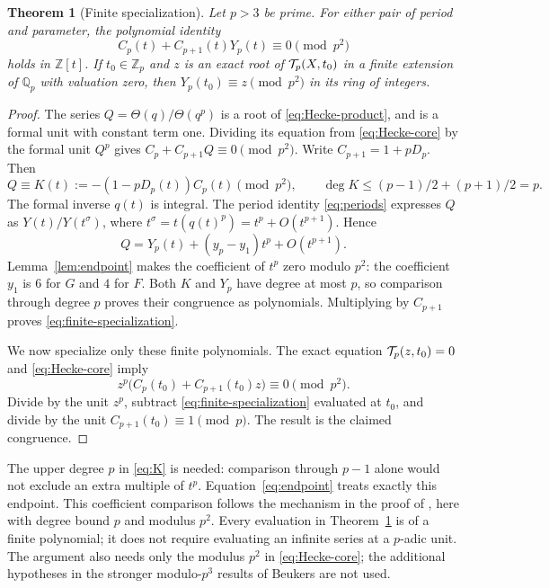 \documentclass[11pt,a4paper]{article}
\newtheorem{theorem}{Theorem}[section]
\theoremstyle{remark}\newtheorem{remark}[theorem]{Remark}
\newcommand{\Z}{\mathbb Z}\newcommand{\Q}{\mathbb Q}
\begin{document}
\begin{theorem}[Finite specialization]\label{thm:specialization}
Let $p>3$ be prime. For either pair of period and parameter, the polynomial identity
\begin{equation}\label{eq:finite-specialization}
 C_p(t)+C_{p+1}(t)Y_p(t)\equiv0\pmod{p^2}
\end{equation}
holds in $\Z[t]$. If $t_0\in\Z_p$ and $z$ is an exact root of
$\mathcal T_p(X,t_0)$ in a finite extension of $\Q_p$ with valuation zero, then
$Y_p(t_0)\equiv z\pmod{p^2}$ in its ring of integers.
\end{theorem}
\begin{proof}
The series $Q=\Theta(q)/\Theta(q^p)$ is a root of
\eqref{eq:Hecke-product}, and is a formal unit with constant term one.
Dividing its equation from \eqref{eq:Hecke-core} by the formal unit $Q^p$
gives $C_p+C_{p+1}Q\equiv0\pmod{p^2}$.
Write $C_{p+1}=1+pD_p$. Then
\begin{equation}\label{eq:K}
 Q\equiv K(t):=-(1-pD_p(t))C_p(t)\pmod{p^2},\qquad
 \deg K\le(p-1)/2+(p+1)/2=p.
\end{equation}
The formal inverse $q(t)$ is integral. The period identity
\eqref{eq:periods} expresses $Q$ as $Y(t)/Y(t^\sigma)$, where
$t^\sigma=t(q(t)^p)=t^p+O(t^{p+1})$. Hence
\begin{equation}\label{eq:Q-boundary}
 Q=Y_p(t)+(y_p-y_1)t^p+O(t^{p+1}).
\end{equation}
Lemma~\ref{lem:endpoint} makes the coefficient of $t^p$ zero modulo $p^2$:
the coefficient $y_1$ is $6$ for $G$ and $4$ for $F$.
Both $K$ and $Y_p$ have degree at most $p$, so comparison through degree
$p$ proves their congruence as polynomials. Multiplying by $C_{p+1}$
proves \eqref{eq:finite-specialization}.

We now specialize only these finite polynomials. The exact equation
$\mathcal T_p(z,t_0)=0$ and \eqref{eq:Hecke-core} imply
\[
 z^p\bigl(C_p(t_0)+C_{p+1}(t_0)z\bigr)\equiv0\pmod{p^2}.
\]
Divide by the unit $z^p$, subtract \eqref{eq:finite-specialization}
evaluated at $t_0$, and divide by the unit
$C_{p+1}(t_0)\equiv1\pmod p$. The result is the claimed congruence.
\end{proof}

The upper degree $p$ in \eqref{eq:K} is needed: comparison through
$p-1$ alone would not exclude an extra multiple of $t^p$.
Equation~\eqref{eq:endpoint} treats exactly this endpoint. This coefficient
comparison follows the mechanism in the proof of
\cite[Theorem~6.1]{beukers}, here with degree bound $p$ and modulus $p^2$.
Every evaluation in Theorem~\ref{thm:specialization} is of a finite
polynomial; it does not require evaluating an infinite series at a
$p$-adic unit. The argument also needs only the modulus $p^2$ in
\eqref{eq:Hecke-core}; the additional hypotheses in the stronger
modulo-$p^3$ results of Beukers are not used.
\end{document}
